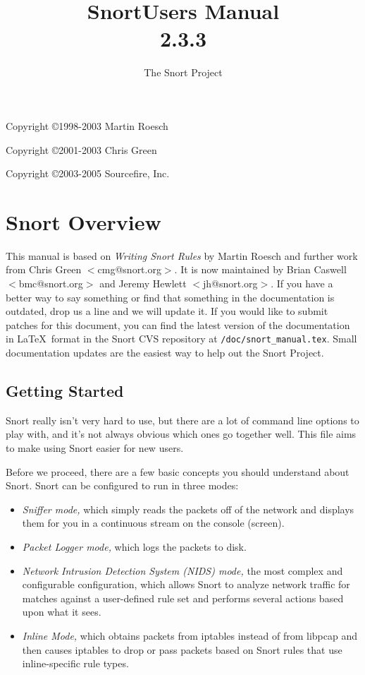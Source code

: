 \documentclass[english]{report}
\begin{document}
\title{Snort\texttrademark  Users Manual\\  2.3.3 }

\author{The Snort Project}

\maketitle

\newpage

Copyright \copyright 1998-2003 Martin Roesch

Copyright \copyright 2001-2003 Chris Green

Copyright \copyright 2003-2005 Sourcefire, Inc.

\tableofcontents{}


\chapter{Snort Overview}

This manual is based on \emph{Writing Snort Rules} by Martin Roesch and
further work from Chris Green $<$cmg@snort.org$>$.  It is now maintained by Brian
Caswell $<$bmc@snort.org$>$ and Jeremy Hewlett $<$jh@snort.org$>$.  If you have a
better way to say something or find that something in the documentation is outdated, drop
us a line and we will update it.  If you would like to submit patches for this
document, you can find the latest version of the documentation in \LaTeX\ 
format in the Snort CVS repository at \verb!/doc/snort_manual.tex!.  Small documentation updates are 
the easiest way to help out the Snort Project.

\section{Getting Started}

Snort really isn't very hard to use, but there are a lot of command line
options to play with, and it's not always obvious which ones go together well.
This file aims to make using Snort easier for new users.

Before we proceed, there are a few basic concepts you should understand about
Snort. Snort can be configured to run in three modes:
\begin{itemize}
\item {\em Sniffer mode,} which simply reads the packets off of the network and displays them 
for you in a continuous stream on the console (screen). 
\item {\em Packet Logger mode,} which logs the packets to disk. 
\item {\em Network Intrusion Detection System (NIDS) mode,} the most complex and configurable configuration,
which allows Snort to analyze network traffic for matches against a user-defined
rule set and performs several actions based upon what it sees.
\item {\em Inline Mode,} which obtains packets from iptables instead of from libpcap and then
causes iptables to drop or pass packets based on Snort rules that use inline-specific rule types.
\end{itemize}
\end{document}
